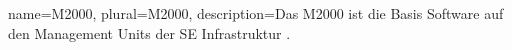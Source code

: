     {
        name=M2000,
        plural=M2000,
        description={Das \gls{M2000} ist die Basis Software auf den Management \glspl{Unit} der SE Infrastruktur \parencite{ManualSEInfrastrukturStrukturderSoftware.FujitsuTechnologySolutionsGmbH.2023}.
        }
    }
